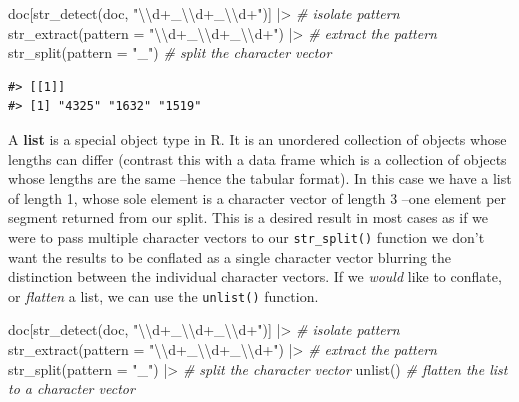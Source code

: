 \documentclass[
  letterpaper,
]{latex/krantz}
\newenvironment{Shaded}{\begin{snugshade}}{\end{snugshade}}
\newcommand{\AttributeTok}[1]{\textcolor[rgb]{0.00,0.00,0.00}{#1}}
\newcommand{\CommentTok}[1]{\textcolor[rgb]{0.00,0.00,0.00}{\textit{#1}}}
\newcommand{\FunctionTok}[1]{\textcolor[rgb]{0.00,0.00,0.00}{#1}}
\newcommand{\NormalTok}[1]{\textcolor[rgb]{0.00,0.00,0.00}{#1}}
\newcommand{\SpecialCharTok}[1]{\textcolor[rgb]{0.00,0.00,0.00}{#1}}
\newcommand{\StringTok}[1]{\textcolor[rgb]{0.00,0.00,0.00}{#1}}
\begin{document}
\begin{Shaded}
\begin{Highlighting}[]
\NormalTok{doc[}\FunctionTok{str\_detect}\NormalTok{(doc, }\StringTok{"}\SpecialCharTok{\textbackslash{}\textbackslash{}}\StringTok{d+\_}\SpecialCharTok{\textbackslash{}\textbackslash{}}\StringTok{d+\_}\SpecialCharTok{\textbackslash{}\textbackslash{}}\StringTok{d+"}\NormalTok{)] }\SpecialCharTok{|\textgreater{}} \CommentTok{\# isolate pattern}
  \FunctionTok{str\_extract}\NormalTok{(}\AttributeTok{pattern =} \StringTok{"}\SpecialCharTok{\textbackslash{}\textbackslash{}}\StringTok{d+\_}\SpecialCharTok{\textbackslash{}\textbackslash{}}\StringTok{d+\_}\SpecialCharTok{\textbackslash{}\textbackslash{}}\StringTok{d+"}\NormalTok{) }\SpecialCharTok{|\textgreater{}} \CommentTok{\# extract the pattern}
  \FunctionTok{str\_split}\NormalTok{(}\AttributeTok{pattern =} \StringTok{"\_"}\NormalTok{) }\CommentTok{\# split the character vector}
\end{Highlighting}
\end{Shaded}

\begin{verbatim}
#> [[1]]
#> [1] "4325" "1632" "1519"
\end{verbatim}

A \textbf{list} is a special object type in R. It is an unordered
collection of objects whose lengths can differ (contrast this with a
data frame which is a collection of objects whose lengths are the same
--hence the tabular format). In this case we have a list of length 1,
whose sole element is a character vector of length 3 --one element per
segment returned from our split. This is a desired result in most cases
as if we were to pass multiple character vectors to our
\texttt{str\_split()} function we don't want the results to be conflated
as a single character vector blurring the distinction between the
individual character vectors. If we \emph{would} like to conflate, or
\emph{flatten} a list, we can use the \texttt{unlist()} function.

\begin{Shaded}
\begin{Highlighting}[]
\NormalTok{doc[}\FunctionTok{str\_detect}\NormalTok{(doc, }\StringTok{"}\SpecialCharTok{\textbackslash{}\textbackslash{}}\StringTok{d+\_}\SpecialCharTok{\textbackslash{}\textbackslash{}}\StringTok{d+\_}\SpecialCharTok{\textbackslash{}\textbackslash{}}\StringTok{d+"}\NormalTok{)] }\SpecialCharTok{|\textgreater{}} \CommentTok{\# isolate pattern}
  \FunctionTok{str\_extract}\NormalTok{(}\AttributeTok{pattern =} \StringTok{"}\SpecialCharTok{\textbackslash{}\textbackslash{}}\StringTok{d+\_}\SpecialCharTok{\textbackslash{}\textbackslash{}}\StringTok{d+\_}\SpecialCharTok{\textbackslash{}\textbackslash{}}\StringTok{d+"}\NormalTok{) }\SpecialCharTok{|\textgreater{}} \CommentTok{\# extract the pattern}
  \FunctionTok{str\_split}\NormalTok{(}\AttributeTok{pattern =} \StringTok{"\_"}\NormalTok{) }\SpecialCharTok{|\textgreater{}} \CommentTok{\# split the character vector}
  \FunctionTok{unlist}\NormalTok{() }\CommentTok{\# flatten the list to a character vector}
\end{Highlighting}
\end{Shaded}
\end{document}
